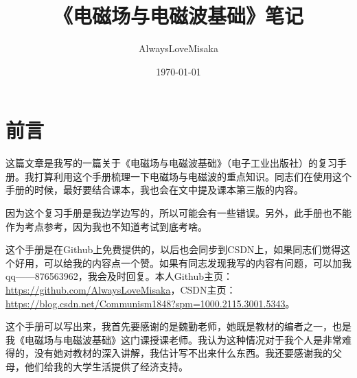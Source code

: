 \documentclass[UTF8,a4paper,11pt]{article}
\title{\huge\heiti《电磁场与电磁波基础》笔记}
\author{AlwaysLoveMisaka}
\date{\today}
\begin{document}
\maketitle
\thispagestyle{empty}
\clearpage

\setcounter{page}{1}
\tableofcontents
\clearpage


\setcounter{page}{1}
\section{前言}
这篇文章是我写的一篇关于《电磁场与电磁波基础》（电子工业出版社）的复习手册。我打算利用这个手册梳理一下电磁场与电磁波的重点知识。同志们在使用这个手册的时候，最好要结合课本，我也会在文中提及课本第三版的内容。

因为这个复习手册是我边学边写的，所以可能会有一些错误。另外，此手册也不能作为考点参考，因为我也不知道考试到底考啥。

这个手册是在Github上免费提供的，以后也会同步到CSDN上，如果同志们觉得这个好用，可以给我的内容点一个赞。如果有同志发现我写的内容有问题，可以加我qq——876563962，我会及时回复。本人Github主页：\url{https://github.com/AlwaysLoveMisaka}，CSDN主页：\url{https://blog.csdn.net/Communism1848?spm=1000.2115.3001.5343}。

这个手册可以写出来，我首先要感谢的是魏勤老师，她既是教材的编者之一，也是我《电磁场与电磁波基础》这门课授课老师。我认为这种情况对于我个人是非常难得的，没有她对教材的深入讲解，我估计写不出来什么东西。我还要感谢我的父母，他们给我的大学生活提供了经济支持。
\end{document}
